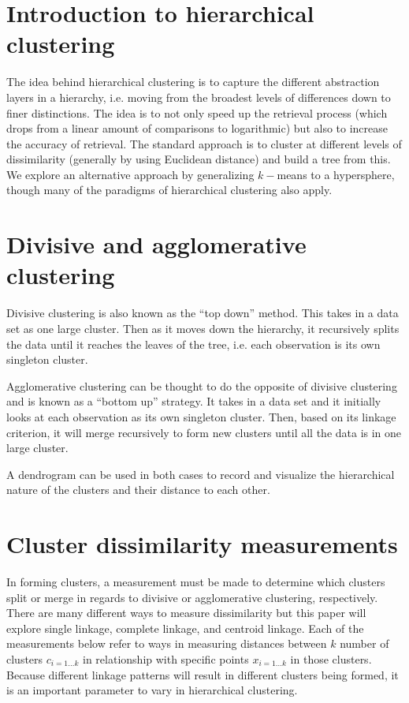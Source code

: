 \documentclass[../tech_report_1.tex]{subfiles}
\begin{document}
\section{Introduction to hierarchical clustering}

The idea behind hierarchical clustering is to capture the different abstraction layers in a hierarchy, i.e. moving from the broadest levels of differences down to finer distinctions. The idea is to not only speed up the retrieval process (which drops from a linear amount of comparisons to logarithmic) but also to increase the accuracy of retrieval. The standard approach is to cluster at different levels of dissimilarity (generally by using Euclidean distance) and build a tree from this. We explore an alternative approach by generalizing $k-$means to a hypersphere, though many of the paradigms of hierarchical clustering also apply.

\section{Divisive and agglomerative clustering}


Divisive clustering \cite{schutze2008introduction} is also known as the ``top down'' method. This takes
in a data set as one large cluster. Then as it moves down the hierarchy,
it recursively splits the data until it reaches the leaves of the tree, i.e. each
observation is its own singleton cluster.

Agglomerative clustering can be thought to do the opposite of divisive
clustering and is known as a ``bottom up'' strategy. It takes in
a data set and it initially looks at each observation as its own singleton
cluster. Then, based on its linkage criterion, it will merge recursively
to form new clusters until all the data is in one large cluster.

A dendrogram \cite{langfelder2008defining} can be used in both cases to record and visualize the hierarchical nature of the
clusters and their distance to each other.

\section{Cluster dissimilarity measurements}


In forming clusters, a measurement must be made to determine which
clusters split or merge in regards to divisive or agglomerative clustering,
respectively. There are many different ways to measure dissimilarity
but this paper will explore single linkage, complete linkage, and
centroid linkage. Each of the measurements below refer to ways in
measuring distances between $k$ number of clusters $c_{i=1\dots k}$
in relationship with specific points $x_{i=1\dots k}$ in those clusters. Because different linkage patterns will result in different clusters being formed, it is an important parameter to vary in hierarchical clustering.
\end{document}
